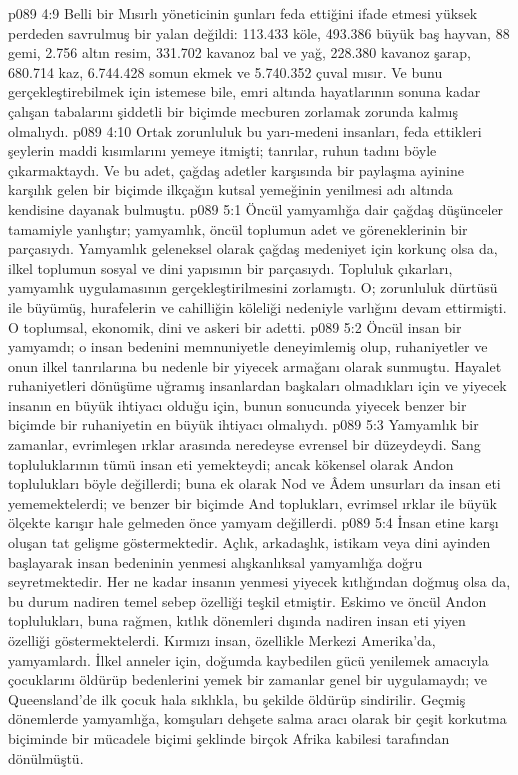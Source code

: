 \vs p089 4:9 Belli bir Mısırlı yöneticinin şunları feda ettiğini ifade etmesi yüksek perdeden savrulmuş bir yalan değildi: 113.433 köle, 493.386 büyük baş hayvan, 88 gemi, 2.756 altın resim, 331.702 kavanoz bal ve yağ, 228.380 kavanoz şarap, 680.714 kaz, 6.744.428 somun ekmek ve 5.740.352 çuval mısır. Ve bunu gerçekleştirebilmek için istemese bile, emri altında hayatlarının sonuna kadar çalışan tabalarını şiddetli bir biçimde mecburen zorlamak zorunda kalmış olmalıydı.
\vs p089 4:10 Ortak zorunluluk bu yarı\hyp{}medeni insanları, feda ettikleri şeylerin maddi kısımlarını yemeye itmişti; tanrılar, ruhun tadını böyle çıkarmaktaydı. Ve bu adet, çağdaş adetler karşısında bir paylaşma ayinine karşılık gelen bir biçimde ilkçağın kutsal yemeğinin yenilmesi adı altında kendisine dayanak bulmuştu.
\vs p089 5:1 Öncül yamyamlığa dair çağdaş düşünceler tamamiyle yanlıştır; yamyamlık, öncül toplumun adet ve göreneklerinin bir parçasıydı. Yamyamlık geleneksel olarak çağdaş medeniyet için korkunç olsa da, ilkel toplumun sosyal ve dini yapısının bir parçasıydı. Topluluk çıkarları, yamyamlık uygulamasının gerçekleştirilmesini zorlamıştı. O; zorunluluk dürtüsü ile büyümüş, hurafelerin ve cahilliğin köleliği nedeniyle varlığını devam ettirmişti. O toplumsal, ekonomik, dini ve askeri bir adetti.
\vs p089 5:2 Öncül insan bir yamyamdı; o insan bedenini memnuniyetle deneyimlemiş olup, ruhaniyetler ve onun ilkel tanrılarına bu nedenle bir yiyecek armağanı olarak sunmuştu. Hayalet ruhaniyetleri dönüşüme uğramış insanlardan başkaları olmadıkları için ve yiyecek insanın en büyük ihtiyacı olduğu için, bunun sonucunda yiyecek benzer bir biçimde bir ruhaniyetin en büyük ihtiyacı olmalıydı.
\vs p089 5:3 Yamyamlık bir zamanlar, evrimleşen ırklar arasında neredeyse evrensel bir düzeydeydi. Sang topluluklarının tümü insan eti yemekteydi; ancak kökensel olarak Andon toplulukları böyle değillerdi; buna ek olarak Nod ve Âdem unsurları da insan eti yememektelerdi; ve benzer bir biçimde And toplukları, evrimsel ırklar ile büyük ölçekte karışır hale gelmeden önce yamyam değillerdi.
\vs p089 5:4 İnsan etine karşı oluşan tat gelişme göstermektedir. Açlık, arkadaşlık, istikam veya dini ayinden başlayarak insan bedeninin yenmesi alışkanlıksal yamyamlığa doğru seyretmektedir. Her ne kadar insanın yenmesi yiyecek kıtlığından doğmuş olsa da, bu durum nadiren temel sebep özelliği teşkil etmiştir. Eskimo ve öncül Andon toplulukları, buna rağmen, kıtlık dönemleri dışında nadiren insan eti yiyen özelliği göstermektelerdi. Kırmızı insan, özellikle Merkezi Amerika’da, yamyamlardı. İlkel anneler için, doğumda kaybedilen gücü yenilemek amacıyla çocuklarını öldürüp bedenlerini yemek bir zamanlar genel bir uygulamaydı; ve Queensland’de ilk çocuk hala sıklıkla, bu şekilde öldürüp sindirilir. Geçmiş dönemlerde yamyamlığa, komşuları dehşete salma aracı olarak bir çeşit korkutma biçiminde bir mücadele biçimi şeklinde birçok Afrika kabilesi tarafından dönülmüştü.
